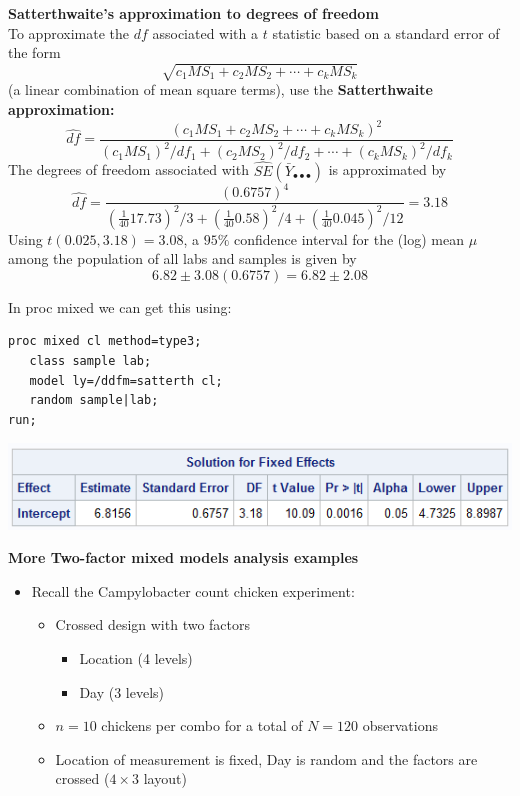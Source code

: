 \textbf{Satterthwaite's approximation to degrees of freedom}\\
To approximate the $df$ associated with a $t$ statistic based on a standard error of the form
$$ \sqrt{c_1 MS_1 + c_2 MS_2 + \cdots + c_k MS_k}$$
(a linear combination of mean square terms), use the \textbf{Satterthwaite approximation:}
$$ \widehat{df} = \frac{(c_1 MS_1 + c_2 MS_2 + \cdots + c_k MS_k)^2}{(c_1 MS_1)^2/df_1 + (c_2 MS_2)^2/df_2 + \cdots + (c_k MS_k)^2/df_k}$$
The degrees of freedom associated with $\widehat{SE}(\bar{Y}_{\bullet\bullet\bullet})$ is approximated by
$$\widehat{df} = \frac{(0.6757)^4}{(\frac{1}{40}17.73)^2/3 + (\frac{1}{40}0.58)^2/4 +  (\frac{1}{40}0.045)^2/12} = 3.18$$
Using $t(0.025,3.18) = 3.08$, a $95\%$ confidence interval for the (log) mean $\mu$ among the population of all labs and samples is given by
$$ 6.82 \pm 3.08 (0.6757)= 6.82 \pm 2.08$$

In proc mixed we can get this using:
\begin{small}
\begin{verbatim}
proc mixed cl method=type3; 
   class sample lab;
   model ly=/ddfm=satterth cl;
   random sample|lab;
run;
\end{verbatim}
\end{small}

\begin{center}
\includegraphics[scale=0.7]{MilkMixed2}
\end{center}

\newpage

\textbf{More Two-factor mixed models analysis examples}
\begin{itemize}
\item Recall the Campylobacter count chicken experiment:
\begin{itemize}
\item Crossed design with two factors
\begin{itemize}
\item Location (4 levels)
\item Day (3 levels)
\end{itemize}
\item $n=10$ chickens per combo for a total of $N=120$ observations
\item Location of measurement is fixed, Day is random and the factors are crossed ($4 \times 3$ layout)
\end{itemize}
\end{itemize}

